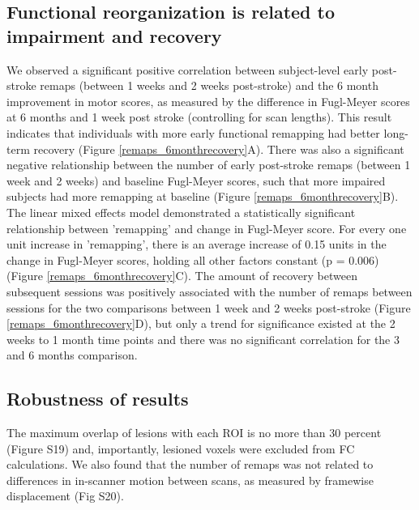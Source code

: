 \documentclass[phd,tocprelim]{cornell}
\begin{document}
	\subsection{Functional reorganization is related to impairment and recovery}
	We observed a significant positive correlation between subject-level early post-stroke remaps (between 1 weeks and 2 weeks post-stroke) and the 6 month improvement in motor scores, as measured by the difference in Fugl-Meyer scores at 6 months and 1 week post stroke (controlling for scan lengths). This result indicates that individuals with more early functional remapping had better long-term recovery (Figure \ref{remaps_6monthrecovery}A). There was also a significant negative relationship between the number of early post-stroke remaps (between 1 week and 2 weeks) and baseline Fugl-Meyer scores, such that more impaired subjects had more remapping at baseline (Figure \ref{remaps_6monthrecovery}B). The linear mixed effects model demonstrated a statistically significant relationship between 'remapping' and change in Fugl-Meyer score. For every one unit increase in 'remapping', there is an average increase of 0.15 units in the change in Fugl-Meyer scores, holding all other factors constant (p = 0.006) (Figure \ref{remaps_6monthrecovery}C). The amount of recovery between subsequent sessions was  positively associated with the number of remaps between sessions for the two comparisons between 1 week and 2 weeks post-stroke (Figure \ref{remaps_6monthrecovery}D), but only a trend for significance existed at the 2 weeks to 1 month time points and there was no significant correlation for the 3 and 6 months comparison.
	
	\subsection*{Robustness of results}
	The maximum overlap of lesions with each ROI is no more than 30 percent (Figure S19) and, importantly, lesioned voxels were excluded from FC calculations. We also found that the number of remaps was not related to differences in in-scanner motion between scans, as measured by framewise displacement (Fig S20).
\end{document}
